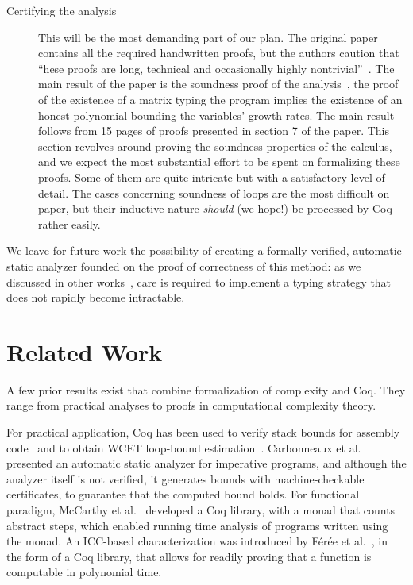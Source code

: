 \documentclass[sigplan,screen,timestamp,%
nonacm]{acmart}
\begin{document}
\begin{description}
	\item[Certifying the analysis]
		This will be the most demanding part of our plan.
        The original paper contains all the required handwritten proofs, but the authors caution that \enquote{hese proofs are long, technical and occasionally highly nontrivial}~\cite[p.~2]{Jones2009}. 
        The main result of the paper is the soundness proof of the analysis~\cite[Theorem 5.3]{Jones2009},
        \ie the proof of the existence of a matrix typing the program implies the existence of an honest polynomial bounding the variables' growth rates.
        The main result follows from 15 pages of proofs presented in section 7 of the paper.
        This section revolves around proving the soundness properties of the calculus,
        and we expect the most substantial effort to be spent on formalizing these proofs.
        Some of them are quite intricate but with a satisfactory level of detail.
		The cases concerning soundness of loops are the most difficult on paper, but their inductive nature \emph{should} (we hope!) be processed by Coq rather easily.%
\end{description}

We leave for future work the possibility of creating a formally verified, automatic static analyzer founded on the proof of correctness of this method: as we discussed in other works~\cite{Aubert2022l,Aubert2022b}, care is required to implement a typing strategy that does not rapidly become intractable.

\section{Related Work}
\label{sec:related}

A few prior results exist that combine formalization of complexity and Coq.
They range from practical analyses to proofs in computational complexity theory.

For practical application, Coq has been used to verify stack bounds for assembly code~\cite{Carbonneaux2014}
and to obtain WCET loop-bound estimation~\cite{Blazy2013}.
Carbonneaux et al. ~\cite{Carbonneaux2017} presented an automatic static analyzer for imperative programs, and although the analyzer itself is not verified, it generates bounds with machine-checkable certificates, to guarantee that the computed bound holds.
For functional paradigm, McCarthy et al.~\cite{McCarthy2018} developed a Coq library, with a monad that counts abstract steps, which enabled running time analysis of programs written using the monad.
An ICC-based characterization was introduced by F\'{e}r\'{e}e et al.~\cite{Feree2018}, in the form of a
Coq library, that allows for readily proving that a function is computable in polynomial time. %
\end{document}
